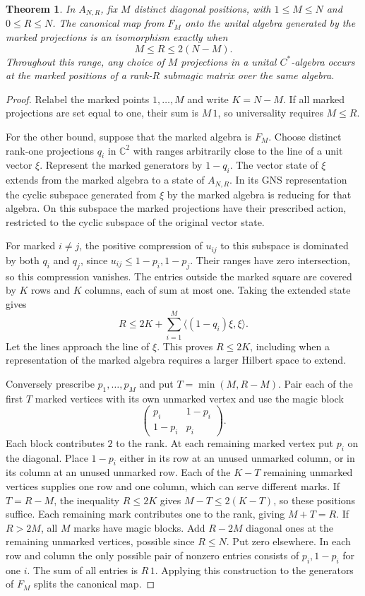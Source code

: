 \documentclass[11pt,a4paper]{article}
\newtheorem{thm}{Theorem}[section]
\begin{document}
\begin{thm}\label{rankfree}
In $A_{N,R}$, fix $M$ distinct diagonal positions, with $1\leq M\leq N$ and $0\leq R\leq N$. The canonical map from $F_M$ onto the unital algebra generated by the marked projections is an isomorphism exactly when
\[
 M\leq R\leq 2(N-M).
\]
Throughout this range, any choice of $M$ projections in a unital $C^*$-algebra occurs at the marked positions of a rank-$R$ submagic matrix over the same algebra.
\end{thm}
\begin{proof}
Relabel the marked points $1,\ldots,M$ and write $K=N-M$. If all marked projections are set equal to one, their sum is $M\,1$, so universality requires $M\leq R$.

For the other bound, suppose that the marked algebra is $F_M$. Choose distinct rank-one projections $q_i$ in $\mathbb C^2$ with ranges arbitrarily close to the line of a unit vector $\xi$. Represent the marked generators by $1-q_i$. The vector state of $\xi$ extends from the marked algebra to a state of $A_{N,R}$. In its GNS representation the cyclic subspace generated from $\xi$ by the marked algebra is reducing for that algebra. On this subspace the marked projections have their prescribed action, restricted to the cyclic subspace of the original vector state.

For marked $i\ne j$, the positive compression of $u_{ij}$ to this subspace is dominated by both $q_i$ and $q_j$, since $u_{ij}\leq1-p_i,1-p_j$. Their ranges have zero intersection, so this compression vanishes. The entries outside the marked square are covered by $K$ rows and $K$ columns, each of sum at most one. Taking the extended state gives
\[
 R\leq 2K+\sum_{i=1}^M\langle(1-q_i)\xi,\xi\rangle .
\]
Let the lines approach the line of $\xi$. This proves $R\leq2K$, including when a representation of the marked algebra requires a larger Hilbert space to extend.

Conversely prescribe $p_1,\ldots,p_M$ and put $T=\min(M,R-M)$. Pair each of the first $T$ marked vertices with its own unmarked vertex and use the magic block
\[
 \begin{pmatrix}p_i&1-p_i\\1-p_i&p_i\end{pmatrix}.
\]
Each block contributes $2$ to the rank. At each remaining marked vertex put $p_i$ on the diagonal. Place $1-p_i$ either in its row at an unused unmarked column, or in its column at an unused unmarked row. Each of the $K-T$ remaining unmarked vertices supplies one row and one column, which can serve different marks. If $T=R-M$, the inequality $R\leq2K$ gives $M-T\leq2(K-T)$, so these positions suffice. Each remaining mark contributes one to the rank, giving $M+T=R$. If $R>2M$, all $M$ marks have magic blocks. Add $R-2M$ diagonal ones at the remaining unmarked vertices, possible since $R\leq N$. Put zero elsewhere. In each row and column the only possible pair of nonzero entries consists of $p_i,1-p_i$ for one $i$. The sum of all entries is $R\,1$. Applying this construction to the generators of $F_M$ splits the canonical map.
\end{proof}
\end{document}
